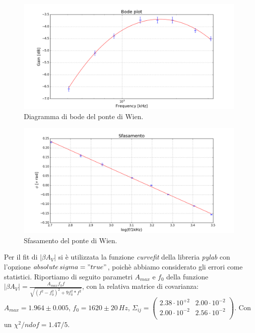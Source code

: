 \documentclass[10pt,a4paper]{article}
\begin{document}
\begin{figure}[!htb]
  \centering
  \includegraphics[scale=.5]{bode.png}
\caption{Diagramma di bode del ponte di Wien.}
\label{bode}
\end{figure}


\begin{figure}[!htb]
  \centering
  \includegraphics[scale=.5]{sfasamento.png}
\caption{Sfasamento del ponte di Wien.}
\label{sfasamento}
\end{figure}

Per il fit di $\vert \beta A_V \vert$ si è utilizzata la funzione \emph{curvefit} della libreria \emph{pylab} con l'opzione \emph{$absolute\,sigma = "true"$}, poichè abbiamo considerato gli errori come statistici. Riportiamo di seguito parametri $A_{max}$ e $f_0$ della funzione $ \vert \beta A_V \vert = \frac{A_{max} f_0 f}{\sqrt{(f^2-f_0^2)^2+9 f_0^2 * f^2}}$, con la relativa matrice di covarianza: $A_{max} = 1.964 \pm 0.005$, $f_0 = 1620 \pm 20 \, Hz$,  $ \Sigma_{ij} = \left( \begin{array}{cc}
2.38 \cdot 10^{+2} & 2.00 \cdot 10^{-2} \\ 
2.00 \cdot 10^{-2} & 2.56 \cdot 10^{-2}\\
\end{array} \right)$. Con un $\chi^2/ndof = 1.47/5$.\\
\end{document}
